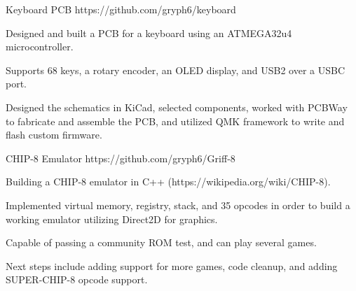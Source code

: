 
\begin{cventries}

  \cventry
    {Keyboard PCB} %
    {}
    {}
    {https://github.com/gryph6/keyboard}
    {
      \begin{cvitems} %
        \item {Designed and built a PCB for a keyboard using an ATMEGA32u4 microcontroller.} 
        \item {Supports 68 keys, a rotary encoder, an OLED display, and USB2 over a USBC port.}
        \item{Designed the schematics in KiCad, selected components, worked with PCBWay to fabricate and assemble the PCB, and utilized QMK framework to write and flash custom firmware.}
      \end{cvitems}
    }
  \cventry
    {CHIP-8 Emulator} %
    {}
    {}
    {https://github.com/gryph6/Griff-8}
    {
      \begin{cvitems} %
      \item {Building a CHIP-8 emulator in C++ (https://wikipedia.org/wiki/CHIP-8).}
        \item{Implemented virtual memory, registry, stack, and 35 opcodes in order to build a working emulator utilizing Direct2D for graphics.}
        \item{Capable of passing a community ROM test, and can play several games.}
        \item {Next steps include adding support for more games, code cleanup, and adding SUPER-CHIP-8 opcode support.}
      \end{cvitems}
    }
\end{cventries}

